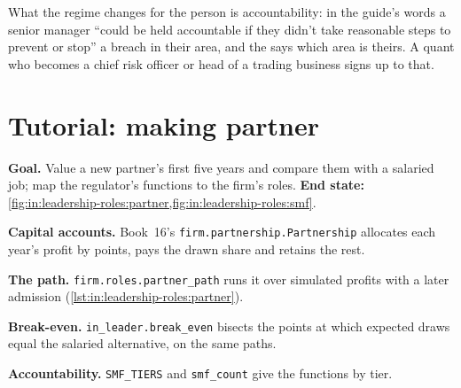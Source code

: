 \begin{omfigure}

\label{fig:in:leadership-roles:smf}
\end{omfigure}

What the regime changes for the person is accountability: in the guide's words a senior manager ``could be held
accountable if they didn't take reasonable steps to prevent or stop'' a breach in their area, and the  says which area is theirs. A quant who becomes a chief risk officer or head of a trading business signs up to that.

\section{Tutorial: making partner}\label{tut:in:leadership-roles:tut}

\begin{tutorial}
\textbf{Goal.} Value a new partner's first five years and compare them with a salaried job; map the regulator's
functions to the firm's roles.
\textbf{End state:} \cref{fig:in:leadership-roles:partner,fig:in:leadership-roles:smf}.
\begin{tutsteps}
\item \textbf{Capital accounts.} Book~16's \texttt{firm.partnership.Partnership} allocates each year's profit by
points, pays the drawn share and retains the rest.
\item \textbf{The path.} \texttt{firm.roles.partner\_path} runs it over simulated profits with a later admission
(\cref{lst:in:leadership-roles:partner}).
\label{lst:in:leadership-roles:partner}
\item \textbf{Break-even.} \texttt{in\_leader.break\_even} bisects the points at which expected draws equal the salaried
alternative, on the same paths.
\item \textbf{Accountability.} \texttt{SMF\_TIERS} and \texttt{smf\_count} give the functions by tier.
\end{tutsteps}
\end{tutorial}

